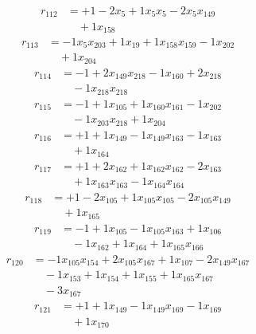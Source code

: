 \[\begin{aligned}
r_{112} &= + 1 - 2 x_{5} + 1 x_{5} x_{5} - 2 x_{5} x_{149} \\
 &\quad + 1 x_{158}
\end{aligned}\]
\[\begin{aligned}
r_{113} &= - 1 x_{5} x_{203} + 1 x_{19} + 1 x_{158} x_{159} - 1 x_{202} \\
 &\quad + 1 x_{204}
\end{aligned}\]
\[\begin{aligned}
r_{114} &= - 1 + 2 x_{149} x_{218} - 1 x_{160} + 2 x_{218} \\
 &\quad - 1 x_{218} x_{218}
\end{aligned}\]
\[\begin{aligned}
r_{115} &= - 1 + 1 x_{105} + 1 x_{160} x_{161} - 1 x_{202} \\
 &\quad - 1 x_{203} x_{218} + 1 x_{204}
\end{aligned}\]
\[\begin{aligned}
r_{116} &= + 1 + 1 x_{149} - 1 x_{149} x_{163} - 1 x_{163} \\
 &\quad + 1 x_{164}
\end{aligned}\]
\[\begin{aligned}
r_{117} &= + 1 + 2 x_{162} + 1 x_{162} x_{162} - 2 x_{163} \\
 &\quad + 1 x_{163} x_{163} - 1 x_{164} x_{164}
\end{aligned}\]
\[\begin{aligned}
r_{118} &= + 1 - 2 x_{105} + 1 x_{105} x_{105} - 2 x_{105} x_{149} \\
 &\quad + 1 x_{165}
\end{aligned}\]
\[\begin{aligned}
r_{119} &= - 1 + 1 x_{105} - 1 x_{105} x_{163} + 1 x_{106} \\
 &\quad - 1 x_{162} + 1 x_{164} + 1 x_{165} x_{166}
\end{aligned}\]
\[\begin{aligned}
r_{120} &= - 1 x_{105} x_{154} + 2 x_{105} x_{167} + 1 x_{107} - 2 x_{149} x_{167} \\
 &\quad - 1 x_{153} + 1 x_{154} + 1 x_{155} + 1 x_{165} x_{167} \\
 &\quad - 3 x_{167}
\end{aligned}\]
\[\begin{aligned}
r_{121} &= + 1 + 1 x_{149} - 1 x_{149} x_{169} - 1 x_{169} \\
 &\quad + 1 x_{170}
\end{aligned}\]
